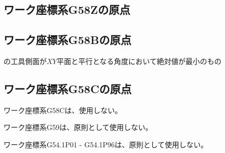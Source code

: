 \subsection{ワーク座標系{\ttfamily G58Z}の原点\TBW}


\subsection{ワーク座標系{\ttfamily G58B}の原点}
\Jig の工具側面が$XY$平面と平行となる角度において絶対値が最小のもの


\subsection{ワーク座標系{\ttfamily G58C}の原点}
ワーク座標系{\ttfamily G58C}は、使用しない。



ワーク座標系{\ttfamily G59}は、原則として使用しない。



ワーク座標系{\ttfamily G54.1\;P01} - {\ttfamily G54.1\;P96}は、原則として使用しない。


